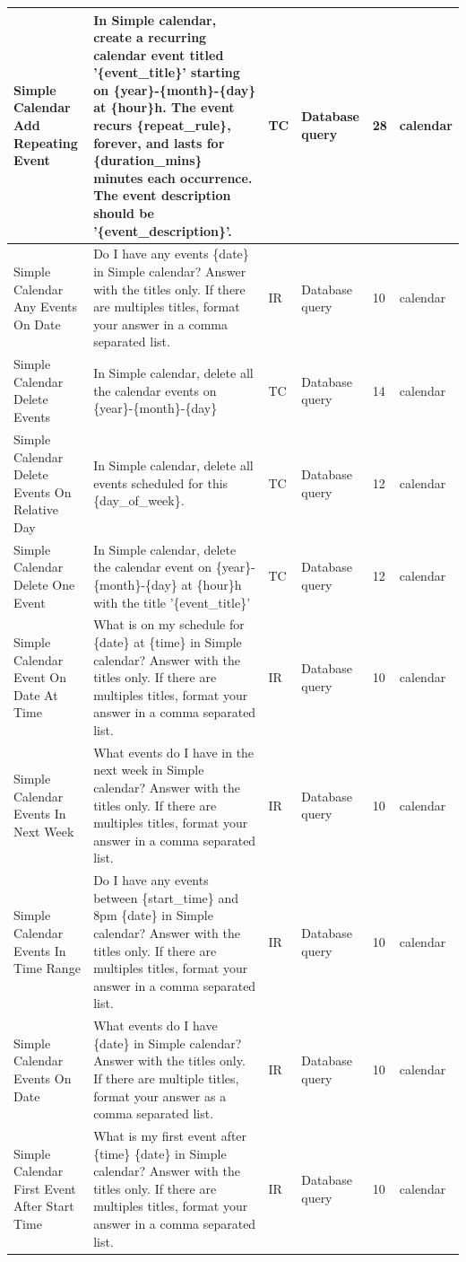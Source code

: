 \documentclass{article}
\begin{document}
\begin{appendices}
\begin{longtable}{>{\RaggedRight\seqsplit}p{.8in}p{2in}p{.3in}p{.5in}p{.3in}p{.5in}}
\midrule
Simple Calendar Add Repeating Event & In Simple calendar, create a recurring calendar event titled '\{event\_title\}' starting on \{year\}-\{month\}-\{day\} at \{hour\}h. The event recurs \{repeat\_rule\}, forever, and lasts for \{duration\_mins\} minutes each occurrence. The event description should be '\{event\_description\}'. & TC & Database query & 28 & calendar \\
\midrule
Simple Calendar Any Events On Date & Do I have any events \{date\} in Simple calendar? Answer with the titles only. If there are multiples titles, format your answer in a comma separated list. & IR & Database query & 10 & calendar \\
\midrule
Simple Calendar Delete Events & In Simple calendar, delete all the calendar events on \{year\}-\{month\}-\{day\} & TC & Database query & 14 & calendar \\
\midrule
Simple Calendar Delete Events On Relative Day & In Simple calendar, delete all events scheduled for this \{day\_of\_week\}. & TC & Database query & 12 & calendar \\
\midrule
Simple Calendar Delete One Event & In Simple calendar, delete the calendar event on \{year\}-\{month\}-\{day\} at \{hour\}h with the title '\{event\_title\}' & TC & Database query & 12 & calendar \\
\midrule
Simple Calendar Event On Date At Time & What is on my schedule for \{date\} at \{time\} in Simple calendar? Answer with the titles only. If there are multiples titles, format your answer in a comma separated list. & IR & Database query & 10 & calendar \\
\midrule
Simple Calendar Events In Next Week & What events do I have in the next week in Simple calendar? Answer with the titles only. If there are multiples titles, format your answer in a comma separated list. & IR & Database query & 10 & calendar \\
\midrule
Simple Calendar Events In Time Range & Do I have any events between \{start\_time\} and 8pm \{date\} in Simple calendar? Answer with the titles only. If there are multiples titles, format your answer in a comma separated list. & IR & Database query & 10 & calendar \\
\midrule
Simple Calendar Events On Date & What events do I have \{date\} in Simple calendar? Answer with the titles only. If there are multiple titles, format your answer as a comma separated list. & IR & Database query & 10 & calendar \\
\midrule
Simple Calendar First Event After Start Time & What is my first event after \{time\} \{date\} in Simple calendar? Answer with the titles only. If there are multiples titles, format your answer in a comma separated list. & IR & Database query & 10 & calendar \\

\end{longtable}
\end{appendices}
\end{document}
